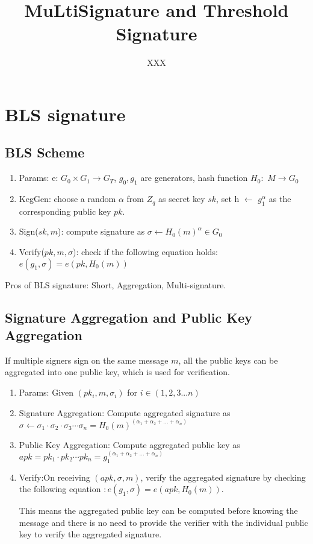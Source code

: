 \documentclass[12pt]{report}
\title{MuLtiSignature and Threshold Signature}
\author{XXX}
\begin{document}
\section{BLS signature}

\subsection{BLS Scheme}
\begin{enumerate}
	\item{Params}: e: $G_{0} \times G_{1} \rightarrow G_{T}$, $g_0,g_1$ are generators, hash function $H_0:$ $M \rightarrow G_0$ 
	\item{KegGen}: choose a random $\alpha$ from $Z_{q}$ as secret key $sk$, set h $\leftarrow$ $g_{1}^\alpha$ as the corresponding public key $pk$.
	\item{Sign($sk,m$)}: compute signature as $\sigma \leftarrow H_{0}(m)^\alpha \in G_{0}$
	\item{Verify($pk,m,\sigma$)}: check if the following equation holds: $e(g_{1},\sigma) =e(pk, H_{0}(m))$
\end{enumerate}
Pros of BLS signature: Short, Aggregation, Multi-signature.

\subsection{Signature Aggregation and Public Key Aggregation}
If multiple signers sign on the same message $m$, all the public keys can be aggregated into one public key, which is used for verification.
\begin{enumerate}
	\item{Params:} Given $(pk_{i}, m, \sigma_{i})$ for $i \in (1,2,3...n)$
	\item{Signature Aggregation:} Compute aggregated signature as $\sigma \leftarrow \sigma_{1}\cdot\sigma_{2}\cdot\sigma_{3}\cdots\sigma_{n}=H_{0}(m)^{(\alpha_{1}+\alpha_{2}+...+\alpha_{n})}$
	\item{Public Key Aggregation:} Compute aggregated public key as $apk=pk_{1} \cdot pk_{2} \cdots pk_{n}= g_{1}^{(\alpha_{1}+\alpha_{2}+...+\alpha_{n})}$
	\item{Verify:}On receiving $(apk,\sigma,m)$, verify the aggregated signature by checking the following equation $: e(g_{1},\sigma)= e(apk,H_{0}(m))$. 
	
	This means the aggregated public key can be computed before knowing the message and there is no need to provide the verifier with the individual public key to verify the aggregated signature.
\end{enumerate}
\end{document}

